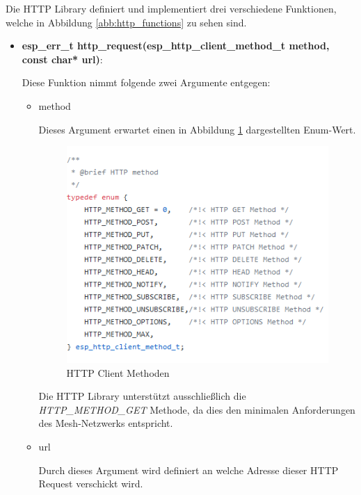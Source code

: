 Die HTTP Library definiert und implementiert drei verschiedene Funktionen, welche in  Abbildung \ref{abb:http_functions} zu sehen sind.

\begin{itemize}
    \item \textbf{esp\_err\_t http\_request(esp\_http\_client\_method\_t method, const char* url)}:

    Diese Funktion nimmt folgende zwei Argumente entgegen:

    \begin{itemize}
        \item method
        
        Dieses Argument erwartet einen in Abbildung \ref{abb:http_client_methods} dargestellten Enum-Wert.

        \begin{figure}[H]
            \begin{center}
                \includegraphics[scale=1]{images/http_client_methods.png}
                \caption{HTTP Client Methoden\cite{http_methods}}
                \label{abb:http_client_methods}
            \end{center}    
        \end{figure}

        Die HTTP Library unterstützt ausschließlich die \textit{HTTP\_METHOD\_GET} Methode, da dies den minimalen Anforderungen des Mesh-Netzwerks entspricht.

        \item url
        
        Durch dieses Argument wird definiert an welche Adresse dieser HTTP Request verschickt wird.


\end{itemize}
\end{itemize}
